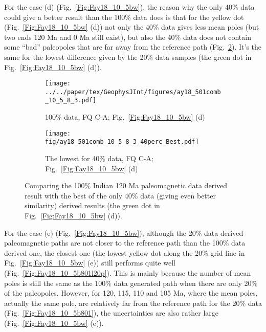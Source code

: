For the case (d) (Fig.~\ref{Fig:Fay18_10_5bw}), the reason why the only 40\%
data could give a better result than the 100\% data does is that for the yellow
dot (Fig.~\ref{Fig:Fay18_10_5bw} (d)) not only the 40\% data gives less mean
poles (but two ends 120 Ma and 0 Ma still exist), but also the 40\% data does
not contain some ``bad'' paleopoles that are far away from the reference path
(Fig.~\ref{Fig:Fay18_10_5w501l40p}). It's the same for the lowest difference
given by the 20\% data samples (the green dot in Fig.~\ref{Fig:Fay18_10_5bw}
(d)).

\begin{figure*}[tbp]
  \captionsetup[subfigure]{labelformat=empty,aboveskip=-6pt,belowskip=-6pt}
  \centering
  \begin{subfigure}[htbp]{.49\textwidth}
    \captionsetup{skip=0pt}
    \centering
    \texttt{[image: ../../paper/tex/GeophysJInt/figures/ay18\_501comb\_10\_5\_8\_3.pdf]}
	\caption{100\% data, FQ C-A; Fig.~\ref{Fig:Fay18_10_5bw}
	(d)}\label{Fig:Fay18_10_5w501}
  \end{subfigure}
  \begin{subfigure}[htbp]{.49\textwidth}
    \captionsetup{skip=0pt}
    \centering
    \texttt{[image: fig/ay18\_501comb\_10\_5\_8\_3\_40perc\_Best.pdf]}  %
    \caption{The lowest for 40\% data, FQ C-A;
	Fig.~\ref{Fig:Fay18_10_5bw} (d)}\label{Fig:Fay18_10_5w501l40p}
  \end{subfigure}
  \caption[Less data, better similarity?]{Comparing the 100\% Indian
  120 Ma paleomagnetic data derived result with the best of the only
  40\% data (giving even better similarity) derived results (the green dot in
  Fig.~\ref{Fig:Fay18_10_5bw} (d)).}\label{Fig:Fay18_10_5w501l40p_vs_100p}
\end{figure*}

For the case (e) (Fig.~\ref{Fig:Fay18_10_5bw}), although the 20\% data derived
paleomagnetic paths are not closer to the reference path than the 100\% data
derived one, the closest one (the lowest yellow dot along the 20\% grid line in
Fig.~\ref{Fig:Fay18_10_5bw} (e)) still performs quite well
(Fig.~\ref{Fig:Fay18_10_5b801l20p}). This is mainly because the number of mean
poles is still the same as the 100\% data generated path when there are only
20\% of the paleopoles. However, for 120, 115, 110 and 105 Ma, where the mean
poles, actually the same pole, are relatively far from the reference path for
the 20\% data (Fig.~\ref{Fig:Fay18_10_5b801}), the uncertainties are also
rather large (Fig.~\ref{Fig:Fay18_10_5bw} (e)).

